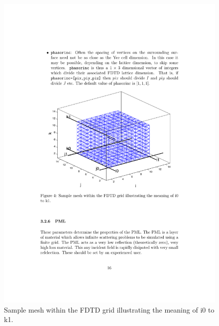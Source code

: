 \documentclass[a4paper, 12pt]{article}
\begin{document}
\begin{itemize}
		\begin{figure}[h]
			\begin{center}
				\includegraphics[width=\textwidth]{figures/3.pdf}
				\caption{Sample mesh within the FDTD grid illustrating the meaning of
					i0 to k1.}
				\label{fig:phasesurf}
			\end{center}
		\end{figure}


	\end{itemize}
\end{document}
